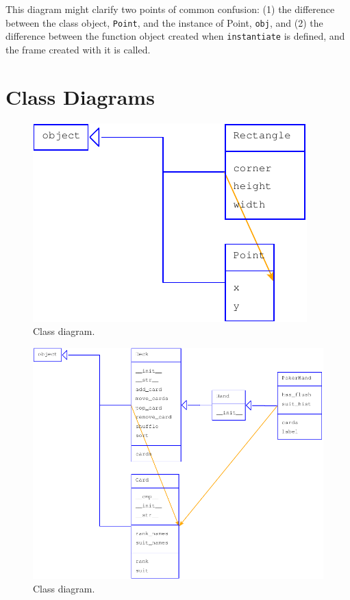 \documentclass[10pt]{book}
\begin{document}
This diagram might clarify two points of common confusion: (1) the
difference between the class object, {\tt Point}, and the instance of
Point, {\tt obj}, and (2) the difference between the function object
created when {\tt instantiate} is defined, and the frame created with
it is called.


\section{Class Diagrams}

\begin{figure}
\centerline
{\includegraphics[scale=0.7]{figs/lumpydemo7.pdf}}
\caption{Class diagram.}
\label{fig.lumpy7}
\end{figure}

\begin{figure}
\centerline
{\includegraphics[scale=0.7]{figs/lumpydemo8.pdf}}
\caption{Class diagram.}
\label{fig.lumpy8}
\end{figure}
\end{document}
